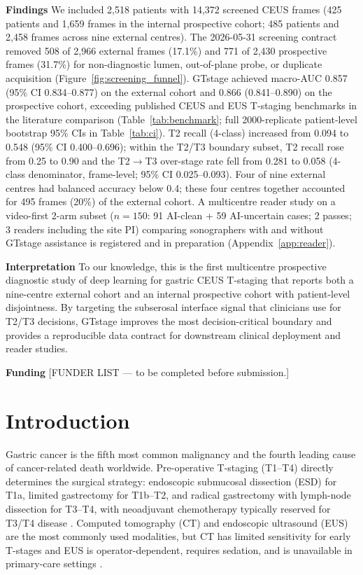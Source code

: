 \documentclass[11pt,a4paper]{article}
\begin{document}
\textbf{Findings} We included 2{,}518 patients with 14{,}372 screened CEUS frames (425 patients and 1{,}659 frames in the internal prospective cohort; 485 patients and 2{,}458 frames across nine external centres). The 2026-05-31 screening contract removed 508 of 2{,}966 external frames (17.1\%) and 771 of 2{,}430 prospective frames (31.7\%) for non-diagnostic lumen, out-of-plane probe, or duplicate acquisition (Figure~\ref{fig:screening_funnel}). GTstage achieved macro-AUC 0.857 (95\% CI 0.834--0.877) on the external cohort and 0.866 (0.841--0.890) on the prospective cohort, exceeding published CEUS and EUS T-staging benchmarks in the literature comparison (Table~\ref{tab:benchmark}; full 2000-replicate patient-level bootstrap 95\% CIs in Table~\ref{tab:ci}). T2 recall (4-class) increased from 0.094 to 0.548 (95\% CI 0.400--0.696); within the T2/T3 boundary subset, T2 recall rose from 0.25 to 0.90 and the T2$\to$T3 over-stage rate fell from 0.281 to 0.058 (4-class denominator, frame-level; 95\% CI 0.025--0.093). Four of nine external centres had balanced accuracy below 0.4; these four centres together accounted for 495 frames (20\%) of the external cohort. A multicentre reader study on a video-first 2-arm subset ($n=150$: 91 AI-clean + 59 AI-uncertain cases; 2 passes; 3 readers including the site PI) comparing sonographers with and without GTstage assistance is registered and in preparation (Appendix~\ref{app:reader}).

\textbf{Interpretation} To our knowledge, this is the first multicentre prospective diagnostic study of deep learning for gastric CEUS T-staging that reports both a nine-centre external cohort and an internal prospective cohort with patient-level disjointness. By targeting the subserosal interface signal that clinicians use for T2/T3 decisions, GTstage improves the most decision-critical boundary and provides a reproducible data contract for downstream clinical deployment and reader studies.

\textbf{Funding} [FUNDER LIST --- to be completed before submission.]

\section{Introduction}

Gastric cancer is the fifth most common malignancy and the fourth leading cause of cancer-related death worldwide. Pre-operative T-staging (T1--T4) directly determines the surgical strategy: endoscopic submucosal dissection (ESD) for T1a, limited gastrectomy for T1b--T2, and radical gastrectomy with lymph-node dissection for T3--T4, with neoadjuvant chemotherapy typically reserved for T3/T4 disease \cite{smyth2017gastric, ajani2017gastric}. Computed tomography (CT) and endoscopic ultrasound (EUS) are the most commonly used modalities, but CT has limited sensitivity for early T-stages and EUS is operator-dependent, requires sedation, and is unavailable in primary-care settings \cite{wee2006ct, kwee2010euse}.
\end{document}
